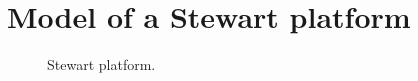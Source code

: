 \documentclass[]{interact}
\theoremstyle{plain}%
\theoremstyle{definition}
\theoremstyle{remark}
\begin{document}
\section{Model of a Stewart platform}
\label{Sec:Stewart_platform_model}

\begin{figure}
\centering
{}\hspace{5pt}
\caption{Stewart platform.} \label{Fig:Stewart_platform_picture}
\end{figure}
\end{document}

